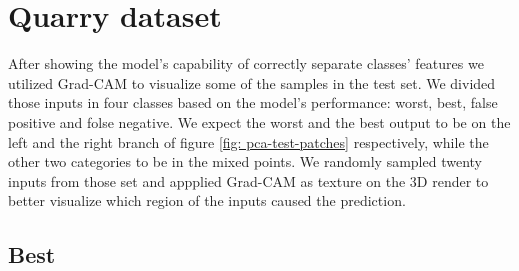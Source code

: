 \documentclass[../document.tex]{subfiles}
\begin{document}
\section{Quarry dataset}
\label{sec: quarry-dataset}
After showing the model's capability of correctly separate classes' features we utilized Grad-CAM to visualize some of the samples in the test set. We divided those inputs in four classes based on the model's performance: worst, best, false positive and folse negative. We expect the worst and the best output to be on the left and the right branch of figure \ref{fig: pca-test-patches} respectively, while the other two categories to be in the mixed points.
We randomly sampled twenty inputs from those set and appplied Grad-CAM as texture on the 3D render to better visualize which region of the inputs caused the prediction. 


\subsection{Best}
\end{document}
